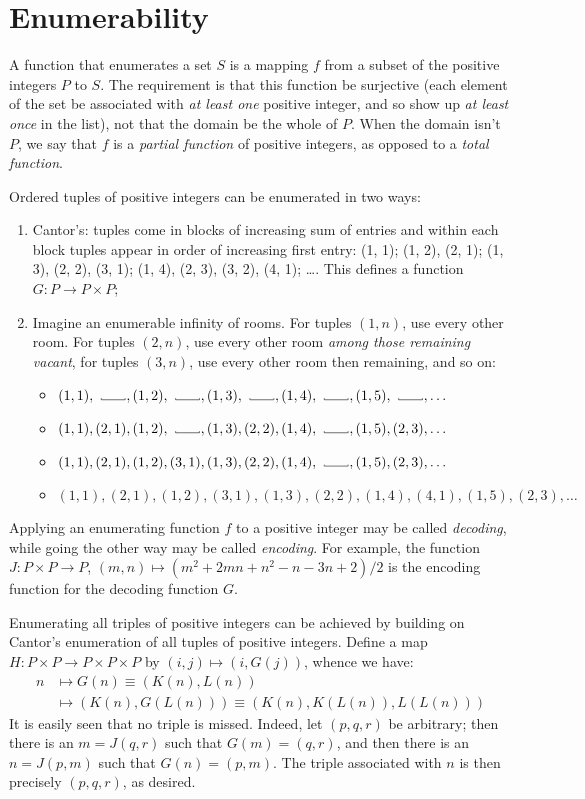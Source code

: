 \section{Enumerability} %
\label{sec:enumerability}
A function that enumerates a set $S$ is a mapping $f$ from a subset of the positive integers $P$ to $S$.
The requirement is that this function be surjective (each element of the set be associated with \emph{at least one} positive integer, and so show up \emph{at least once} in the list), not that the domain be the whole of $P$.
When the domain isn't $P$, we say that $f$ is a \emph{partial function} of positive integers, as opposed to a \emph{total function}.

Ordered tuples of positive integers can be enumerated in two ways:
\begin{enumerate}
  \item Cantor's: tuples come in blocks of increasing sum of entries and within each block tuples appear in order of increasing first entry: (1, 1); (1, 2), (2, 1); (1, 3), (2, 2), (3, 1); (1, 4), (2, 3), (3, 2), (4, 1); \ldots.
  This defines a function $G\colon P \to P \times P$;
  \item Imagine an enumerable infinity of rooms.
  For tuples $(1, n)$, use every other room.
  For tuples $(2, n)$, use every other room \emph{among those remaining vacant}, for tuples $(3, n)$, use every other room then remaining, and so on:
  \begin{itemize}
    \newcommand\room{\vartextvisiblespace[\widthof{$(1,1)$}]}
    \item $(1,1), \room, (1,2), \room, (1,3), \room, (1,4), \room, (1,5), \room, \ldots$
    \item $(1,1), (2,1), (1,2), \room, (1,3), (2,2), (1,4), \room, (1,5), (2,3), \ldots$
    \item $(1,1), (2,1), (1,2), (3,1), (1,3), (2,2), (1,4), \room, (1,5), (2,3), \ldots$
    \item $(1,1), (2,1), (1,2), (3,1), (1,3), (2,2), (1,4), (4,1), (1,5), (2,3), \ldots$
  \end{itemize}
\end{enumerate}

Applying an enumerating function $f$ to a positive integer may be called \emph{decoding}, while going the other way may be called \emph{encoding}.
For example, the function $J\colon P \times P \to P$, $(m,n) \mapsto (m^2+2mn+n^2-n-3n+2)/2$ is the encoding function for the decoding function $G$.

Enumerating all triples of positive integers can be achieved by building on Cantor's enumeration of all tuples of positive integers.
Define a map $H\colon P \times P \to P \times P \times P$ by $(i,j) \mapsto (i, G(j))$, whence we have:
\begin{align*}
  n &\mapsto G(n) \equiv (K(n), L(n)) \\
    &\mapsto (K(n), G(L(n))) \equiv (K(n), K(L(n)), L(L(n)))
\end{align*}
It is easily seen that no triple is missed.
Indeed, let $(p,q,r)$ be arbitrary; then there is an $m = J(q,r)$ such that $G(m) = (q,r)$, and then there is an $n = J(p,m)$ such that $G(n) = (p,m)$.
The triple associated with $n$ is then precisely $(p,q,r)$, as desired.

